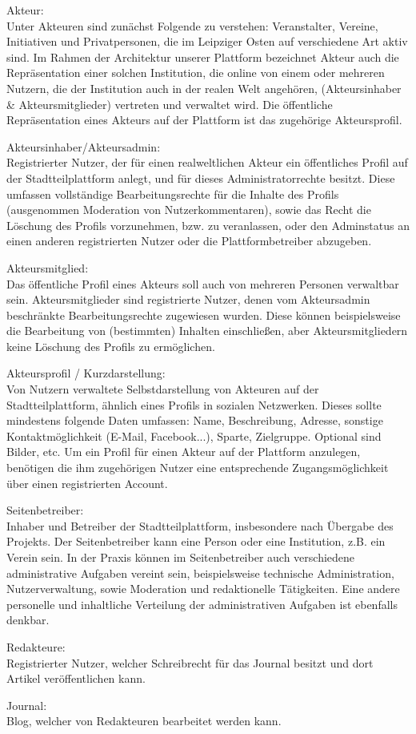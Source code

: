 \documentclass{swp}
\begin{document}
Akteur:\\
Unter Akteuren sind zun\"achst Folgende zu verstehen: Veranstalter, Vereine, Initiativen und Privatpersonen, die im Leipziger Osten auf verschiedene Art aktiv sind. Im Rahmen der Architektur unserer Plattform bezeichnet \glqq Akteur\grqq{} auch die Repr\"asentation einer solchen Institution, die online von einem oder mehreren Nutzern, die der Institution auch in der realen Welt angeh\"oren, (Akteursinhaber \& Akteursmitglieder) vertreten und verwaltet wird. Die \"offentliche Repr\"asentation eines Akteurs auf der Plattform ist das zugeh\"orige Akteursprofil.

Akteursinhaber/Akteursadmin:\\Registrierter Nutzer, der f\"ur einen realweltlichen Akteur ein \"offentliches Profil auf der Stadtteilplattform anlegt, und f\"ur dieses Administratorrechte besitzt. Diese umfassen vollst\"andige Bearbeitungsrechte f\"ur die Inhalte des Profils (ausgenommen Moderation von Nutzerkommentaren), sowie das Recht die L\"oschung des Profils vorzunehmen, bzw. zu veranlassen, oder den Adminstatus an einen anderen registrierten Nutzer oder die Plattformbetreiber abzugeben.

Akteursmitglied:\\Das \"offentliche Profil eines Akteurs soll auch von mehreren Personen verwaltbar sein. Akteursmitglieder sind registrierte Nutzer, denen vom Akteursadmin beschr\"ankte Bearbeitungsrechte zugewiesen wurden. Diese k\"onnen beispielsweise die Bearbeitung von (bestimmten) Inhalten einschlie{\ss}en, aber Akteursmitgliedern keine L\"oschung des Profils zu erm\"oglichen.

Akteursprofil / Kurzdarstellung:\\Von Nutzern verwaltete Selbstdarstellung von Akteuren auf der Stadtteilplattform, \"ahnlich eines Profils in sozialen Netzwerken. Dieses sollte mindestens folgende Daten umfassen: Name, Beschreibung, Adresse, sonstige Kontaktm\"oglichkeit (E-Mail, Facebook...), Sparte, Zielgruppe. Optional sind Bilder, etc. Um ein Profil f\"ur einen Akteur auf der Plattform anzulegen, ben\"otigen die ihm zugeh\"origen Nutzer eine entsprechende Zugangsm\"oglichkeit \"uber einen registrierten Account.

Seitenbetreiber:\\Inhaber und Betreiber der Stadtteilplattform, insbesondere nach \"Ubergabe des Projekts. Der Seitenbetreiber kann eine Person oder eine Institution, z.B. ein Verein sein. In der Praxis k\"onnen im Seitenbetreiber auch verschiedene administrative Aufgaben vereint sein, beispielsweise technische Administration, Nutzerverwaltung, sowie Moderation und redaktionelle T\"atigkeiten. Eine andere personelle und inhaltliche Verteilung der administrativen Aufgaben ist ebenfalls denkbar.

Redakteure:\\Registrierter Nutzer, welcher Schreibrecht f\"ur das Journal besitzt und dort Artikel ver\"offentlichen kann.

Journal:\\Blog, welcher von Redakteuren bearbeitet werden kann.
\end{document}
